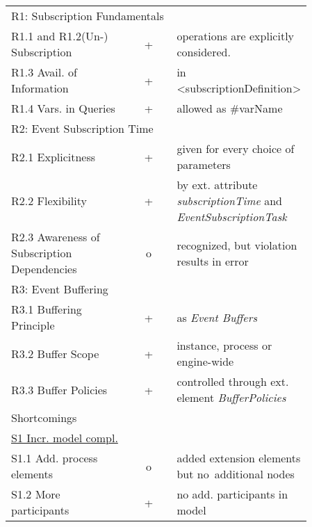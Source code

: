 \begin{table}%
	\myfloatalign
	\begin{tabularx}{\textwidth}{p{0.4\linewidth} | c | p{0.455\linewidth}}
		\toprule
		\tableheadline{Aspect} & \tableheadline{Ev.} & \tableheadline{Explanation} \\ 
		\midrule
		
		\multicolumn{3}{p{\linewidth}}{\rule{0pt}{4ex} R1: Subscription Fundamentals} \\
		\midrule
		
		R1.1 and R1.2\newline(Un-)\,Subscription & + & operations are explicitly considered. \\
		R1.3 Avail. of Information & + & in <subscriptionDefinition> \\
		R1.4 Vars. in Queries & + & allowed as \#{varName} \\
		
		\midrule
		\multicolumn{3}{p{\linewidth}}{\rule{0pt}{4ex} R2: Event Subscription Time} \\
		\midrule
		
		R2.1 Explicitness & + & given for every choice of parameters \\
		R2.2 Flexibility & + & by ext. attribute \textit{subscriptionTime} and \textit{EventSubscriptionTask} \\
		R2.3 Awareness of Subscription Dependencies & o & recognized, but violation results in error \\
		
		\midrule
		\multicolumn{3}{p{\linewidth}}{\rule{0pt}{4ex} R3: Event Buffering} \\
		\midrule
		
		R3.1 Buffering Principle & + & as \textit{Event Buffers} \\
		R3.2 Buffer Scope & + & instance, process or engine-wide \\
		R3.3 Buffer Policies & + & controlled through ext. element \textit{BufferPolicies} \\
		
		\midrule
		\multicolumn{3}{p{\linewidth}}{\rule{0pt}{4ex} Shortcomings} \\
		\midrule
		
		\rule{0pt}{4ex}\underline{S1 Incr. model compl.} & & \\
		S1.1 Add. process elements & o & added extension elements but no~additional nodes \\
		S1.2 More participants & + & no add. participants in model \\
		

\end{tabularx}
\end{table}
